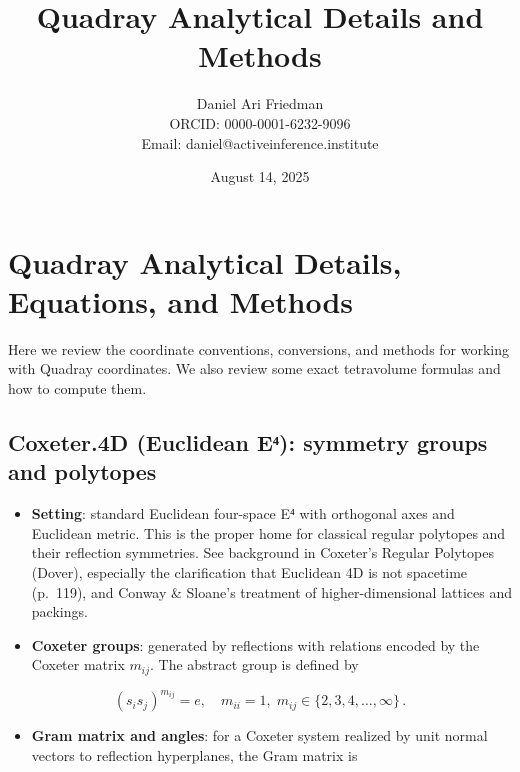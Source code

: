 \documentclass[
  10pt,
]{article}
\title{Quadray Analytical Details and Methods}
\author{Daniel Ari Friedman\\ ORCID: 0000-0001-6232-9096\\ Email: daniel@activeinference.institute}
\date{August 14, 2025}
\providecommand{\tightlist}{%
  \setlength{\itemsep}{0pt}\setlength{\parskip}{0pt}}
\begin{document}
\maketitle

{
\hypersetup{linkcolor=red}
\setcounter{tocdepth}{3}
\tableofcontents
}
\hypertarget{quadray-analytical-details-equations-and-methods}{%
\section{Quadray Analytical Details, Equations, and
Methods}\label{quadray-analytical-details-equations-and-methods}}

Here we review the coordinate conventions, conversions, and methods for
working with Quadray coordinates. We also review some exact tetravolume
formulas and how to compute them.

\hypertarget{coxeter.4d-euclidean-eux2074-symmetry-groups-and-polytopes}{%
\subsection{Coxeter.4D (Euclidean E⁴): symmetry groups and
polytopes}\label{coxeter.4d-euclidean-eux2074-symmetry-groups-and-polytopes}}

\begin{itemize}
\tightlist
\item
  \textbf{Setting}: standard Euclidean four-space E⁴ with orthogonal
  axes and Euclidean metric. This is the proper home for classical
  regular polytopes and their reflection symmetries. See background in
  Coxeter's Regular Polytopes (Dover), especially the clarification that
  Euclidean 4D is not spacetime (p.~119), and Conway \& Sloane's
  treatment of higher-dimensional lattices and packings.
\item
  \textbf{Coxeter groups}: generated by reflections with relations
  encoded by the Coxeter matrix \(m_{ij}\). The abstract group is
  defined by
\end{itemize}

\begin{equation}\label{eq:coxeter_relations}
(s_i s_j)^{m_{ij}} = e,\quad m_{ii}=1,\; m_{ij}\in\{2,3,4,\ldots,\infty\}\,.
\end{equation}

\begin{itemize}
\tightlist
\item
  \textbf{Gram matrix and angles}: for a Coxeter system realized by unit
  normal vectors to reflection hyperplanes, the Gram matrix is
\end{itemize}
\end{document}
